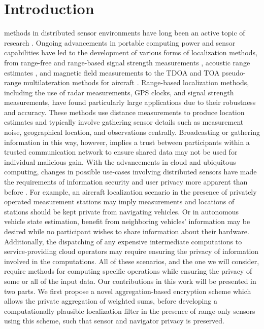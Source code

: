 \documentclass[10pt,letterpaper,oneside,twocolumn,journal]{IEEEtran}
\theoremstyle{definition}
\theoremstyle{definition}
\theoremstyle{remark}
\begin{document}
\section{Introduction} \label{sec:introduction}
 methods in distributed sensor environments have long been an active topic of research \cite{pierceIntroductionLoran1946,liContributedReviewSourcelocalization2016}. Ongoing advancements in portable computing power and sensor capabilities have led to the development of various forms of localization methods, from range-free and range-based signal strength measurements \cite{wangConvexCombinationSource2018,heRangeFreeLocalizationSchemes2003}, acoustic range estimates \cite{beutlerNewNonlinearFiltering2004}, and magnetic field measurements \cite{sieblerLocalizationMagneticField2020} to the TDOA and TOA pseudo-range multilateration methods for aircraft \cite{liContributedReviewSourcelocalization2016}. Range-based localization methods, including the use of radar measurements, GPS clocks, and signal strength measurements, have found particularly large applications due to their robustness and accuracy. These methods use distance measurements to produce location estimates and typically involve gathering sensor details such as measurement noise, geographical location, and observations centrally. Broadcasting or gathering information in this way, however, implies a trust between participants within a trusted communication network to ensure shared data may not be used for individual malicious gain. With the advancements in cloud and ubiquitous computing, changes in possible use-cases involving distributed sensors have made the requirements of information security and user privacy more apparent than before \cite{brennerSecretProgramExecution2011,renSecurityChallengesPublic2012}. For example, an aircraft localization scenario in the presence of privately operated measurement stations may imply measurements and locations of stations should be kept private from navigating vehicles. Or in autonomous vehicle state estimation, benefit from neighboring vehicles' information may be desired while no participant wishes to share information about their hardware. Additionally, the dispatching of any expensive intermediate computations to service-providing cloud operators may require ensuring the privacy of information involved in the computations. All of these scenarios, and the one we will consider, require methods for computing specific operations while ensuring the privacy of some or all of the input data. Our contributions in this work will be presented in two parts. We first propose a novel aggregation-based encryption scheme which allows the private aggregation of weighted sums, before developing a computationally plausible localization filter in the presence of range-only sensors using this scheme, such that sensor and navigator privacy is preserved.
\end{document}
